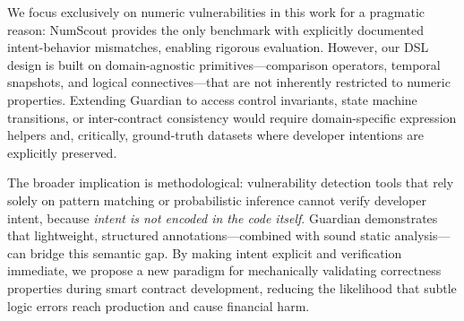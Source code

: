 \documentclass[pdflatex,sn-basic]{sn-jnl}%
\theoremstyle{thmstyleone}%
\theoremstyle{thmstyletwo}%
\theoremstyle{thmstylethree}%
\begin{document}
We focus exclusively on numeric vulnerabilities in this work for a pragmatic reason: NumScout provides the only benchmark with explicitly documented intent-behavior mismatches, enabling rigorous evaluation. However, our DSL design is built on domain-agnostic primitives—comparison operators, temporal snapshots, and logical connectives—that are not inherently restricted to numeric properties. Extending Guardian to access control invariants, state machine transitions, or inter-contract consistency would require domain-specific expression helpers and, critically, ground-truth datasets where developer intentions are explicitly preserved.

The broader implication is methodological: vulnerability detection tools that rely solely on pattern matching or probabilistic inference cannot verify developer intent, because \textit{intent is not encoded in the code itself}. Guardian demonstrates that lightweight, structured annotations—combined with sound static analysis—can bridge this semantic gap. By making intent explicit and verification immediate, we propose a new paradigm for mechanically validating correctness properties during smart contract development, reducing the likelihood that subtle logic errors reach production and cause financial harm.

\newif\ifshowack          %
\showackfalse             %

\ifshowack
  \section*{Acknowledgment}  
\fi
\end{document}
